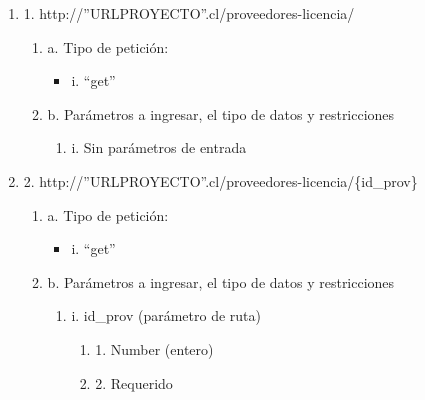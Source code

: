 \begin{enumerate}
    \item 1. http://”URLPROYECTO”.cl/proveedores-licencia/
    \begin{enumerate}
        \item a. Tipo de petición:
            \begin{itemize}
               \item i. “get”
            \end{itemize}
        \item b. Parámetros a ingresar, el tipo de datos y restricciones
            \begin{enumerate}
                \item i. Sin parámetros de entrada
            \end{enumerate}
    \end{enumerate}

    \item 2. http://”URLPROYECTO”.cl/proveedores-licencia/\{id\_prov\}
    \begin{enumerate}
        \item a. Tipo de petición:
            \begin{itemize}
               \item i. “get”
            \end{itemize}
        \item b. Parámetros a ingresar, el tipo de datos y restricciones
            \begin{enumerate}
                \item i. id\_prov (parámetro de ruta)
                    \begin{enumerate}
                        \item 1. Number (entero)
                        \item 2. Requerido
                    \end{enumerate}
            \end{enumerate}
    \end{enumerate}


\end{enumerate}
